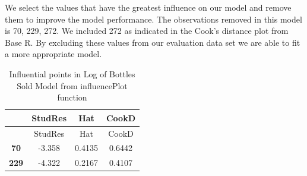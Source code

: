 \documentclass[]{elsarticle} %
\begin{document}
We select the values that have the greatest influence on our model and
remove them to improve the model performance. The observations removed
in this model is 70, 229, 272. We included 272 as indicated in the
Cook's distance plot from Base R. By excluding these values from our
evaluation data set we are able to fit a more appropriate model.

\begin{longtable}[]{@{}cccc@{}}
\caption{Influential points in Log of Bottles Sold Model from
influencePlot function}\tabularnewline
\toprule
\begin{minipage}[b]{0.12\columnwidth}\centering\strut
~\strut
\end{minipage} & \begin{minipage}[b]{0.12\columnwidth}\centering\strut
StudRes\strut
\end{minipage} & \begin{minipage}[b]{0.09\columnwidth}\centering\strut
Hat\strut
\end{minipage} & \begin{minipage}[b]{0.09\columnwidth}\centering\strut
CookD\strut
\end{minipage}\tabularnewline
\midrule
\endfirsthead
\toprule
\begin{minipage}[b]{0.12\columnwidth}\centering\strut
~\strut
\end{minipage} & \begin{minipage}[b]{0.12\columnwidth}\centering\strut
StudRes\strut
\end{minipage} & \begin{minipage}[b]{0.09\columnwidth}\centering\strut
Hat\strut
\end{minipage} & \begin{minipage}[b]{0.09\columnwidth}\centering\strut
CookD\strut
\end{minipage}\tabularnewline
\midrule
\endhead
\begin{minipage}[t]{0.12\columnwidth}\centering\strut
\textbf{70}\strut
\end{minipage} & \begin{minipage}[t]{0.12\columnwidth}\centering\strut
-3.358\strut
\end{minipage} & \begin{minipage}[t]{0.09\columnwidth}\centering\strut
0.4135\strut
\end{minipage} & \begin{minipage}[t]{0.09\columnwidth}\centering\strut
0.6442\strut
\end{minipage}\tabularnewline
\begin{minipage}[t]{0.12\columnwidth}\centering\strut
\textbf{229}\strut
\end{minipage} & \begin{minipage}[t]{0.12\columnwidth}\centering\strut
-4.322\strut
\end{minipage} & \begin{minipage}[t]{0.09\columnwidth}\centering\strut
0.2167\strut
\end{minipage} & \begin{minipage}[t]{0.09\columnwidth}\centering\strut
0.4107\strut
\end{minipage}\tabularnewline
\bottomrule
\end{longtable}
\end{document}
